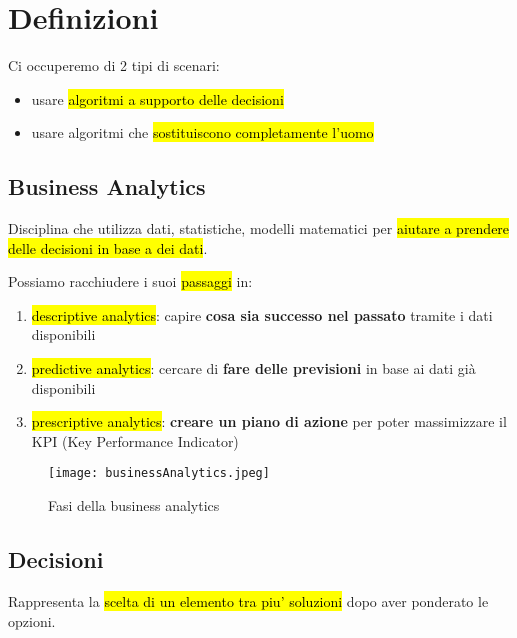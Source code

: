 \newpage
\section{Definizioni}

Ci occuperemo di 2 tipi di scenari:
\begin{itemize}
	\item usare \hl{algoritmi a supporto delle decisioni}
	\item usare algoritmi che \hl{sostituiscono completamente l'uomo}
\end{itemize}


\subsection{Business Analytics}

Disciplina che utilizza dati, statistiche, modelli matematici per \hl{aiutare a prendere delle decisioni in base a dei dati}.

Possiamo racchiudere i suoi \hl{passaggi} in:
\begin{enumerate}
	\item \hl{descriptive analytics}: capire \textbf{cosa sia successo nel passato} tramite i dati disponibili
	\item \hl{predictive analytics}: cercare di \textbf{fare delle previsioni} in base ai dati già disponibili
	\item \hl{prescriptive analytics}: \textbf{creare un piano di azione} per poter massimizzare il KPI (Key Performance Indicator)
\end{enumerate}

\begin{figure}[H]
\centering
\texttt{[image: businessAnalytics.jpeg]}
\caption{Fasi della business analytics} 
\label{busana}
\end{figure}


\subsection{Decisioni}

Rappresenta la \hl{scelta di un elemento tra piu' soluzioni} dopo aver ponderato le opzioni.

